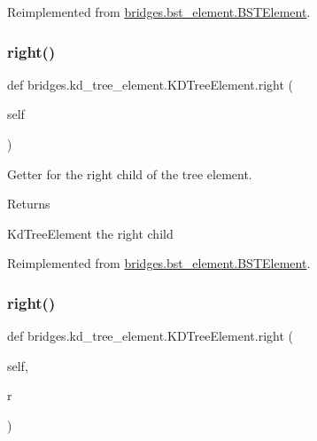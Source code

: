 Reimplemented from \mbox{\hyperlink{classbridges_1_1bst__element_1_1_b_s_t_element_a0b45e63b73faabb6b969dd6222e07942}{bridges.\+bst\+\_\+element.\+B\+S\+T\+Element}}.

\mbox{\label{classbridges_1_1kd__tree__element_1_1_k_d_tree_element_acbcfa46ba613daaf922d8b632b795a86}} 
\subsubsection{\texorpdfstring{right()}{right()}\hspace{0.1cm}{\footnotesize\ttfamily [1/2]}}
{\footnotesize\ttfamily def bridges.\+kd\+\_\+tree\+\_\+element.\+K\+D\+Tree\+Element.\+right (\begin{DoxyParamCaption}\item[{}]{self }\end{DoxyParamCaption})}



Getter for the right child of the tree element. 

\begin{DoxyReturn}{Returns}


Kd\+Tree\+Element the right child 
\end{DoxyReturn}


Reimplemented from \mbox{\hyperlink{classbridges_1_1bst__element_1_1_b_s_t_element_a3ec82fbc56a5e6309b69d2d963b483fd}{bridges.\+bst\+\_\+element.\+B\+S\+T\+Element}}.

\mbox{\label{classbridges_1_1kd__tree__element_1_1_k_d_tree_element_a89071f192bee403a44f92c86a5fdc49d}} 
\subsubsection{\texorpdfstring{right()}{right()}\hspace{0.1cm}{\footnotesize\ttfamily [2/2]}}
{\footnotesize\ttfamily def bridges.\+kd\+\_\+tree\+\_\+element.\+K\+D\+Tree\+Element.\+right (\begin{DoxyParamCaption}\item[{}]{self,  }\item[{}]{r }\end{DoxyParamCaption})}



